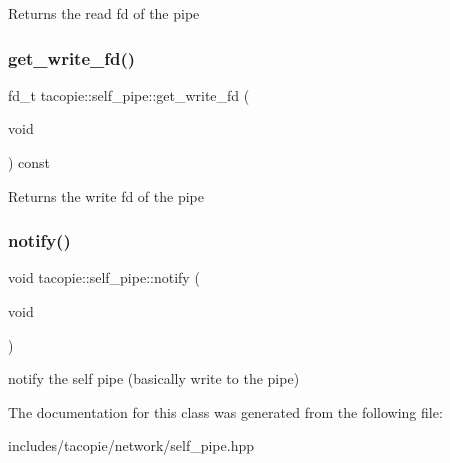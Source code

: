 \begin{DoxyReturn}{Returns}
the read fd of the pipe 
\end{DoxyReturn}
\mbox{\label{classtacopie_1_1self__pipe_ab36a4deb45bb408988f26315aedc0d74}} 
\subsubsection{\texorpdfstring{get\+\_\+write\+\_\+fd()}{get\_write\_fd()}}
{\footnotesize\ttfamily fd\+\_\+t tacopie\+::self\+\_\+pipe\+::get\+\_\+write\+\_\+fd (\begin{DoxyParamCaption}\item[{void}]{ }\end{DoxyParamCaption}) const}

\begin{DoxyReturn}{Returns}
the write fd of the pipe 
\end{DoxyReturn}
\mbox{\label{classtacopie_1_1self__pipe_ade9e0e3d19b8d4d22977935a578d508e}} 
\subsubsection{\texorpdfstring{notify()}{notify()}}
{\footnotesize\ttfamily void tacopie\+::self\+\_\+pipe\+::notify (\begin{DoxyParamCaption}\item[{void}]{ }\end{DoxyParamCaption})}

notify the self pipe (basically write to the pipe) 

The documentation for this class was generated from the following file\+:\begin{DoxyCompactItemize}
\item 
includes/tacopie/network/self\+\_\+pipe.\+hpp\end{DoxyCompactItemize}
